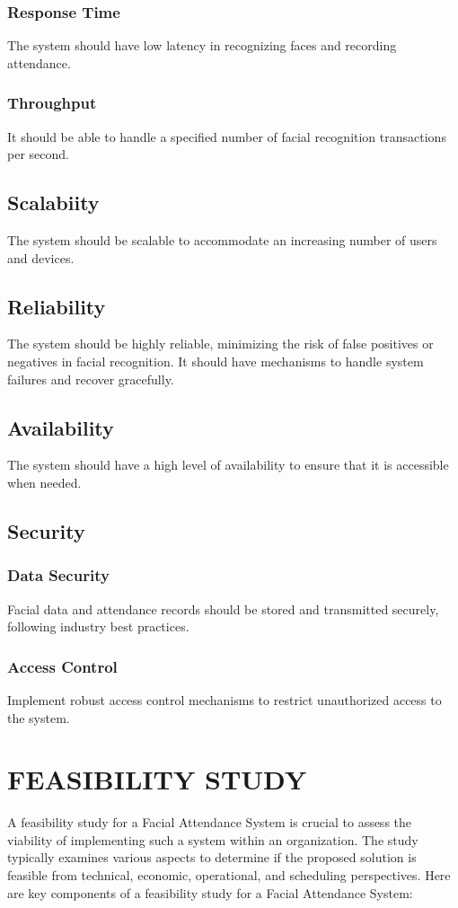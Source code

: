 \subsubsection{Response Time} The system should have low latency in recognizing faces and recording attendance.
\subsubsection{Throughput} It should be able to handle a specified number of facial recognition transactions per second.
\subsection{Scalabiity}
The system should be scalable to accommodate an increasing number of users and devices.
\subsection{Reliability}
The system should be highly reliable, minimizing the risk of false positives or negatives in facial recognition.
It should have mechanisms to handle system failures and recover gracefully.
\subsection{Availability}
The system should have a high level of availability to ensure that it is accessible when needed.
\subsection{Security}
\subsubsection{Data Security} Facial data and attendance records should be stored and transmitted securely, following industry best practices.
\subsubsection{Access Control}Implement robust access control mechanisms to restrict unauthorized access to the system.

        \section{FEASIBILITY STUDY}
        
A feasibility study for a Facial Attendance System is crucial to assess the viability of implementing such a system within an organization. The study typically examines various aspects to determine if the proposed solution is feasible from technical, economic, operational, and scheduling perspectives. Here are key components of a feasibility study for a Facial Attendance System:

